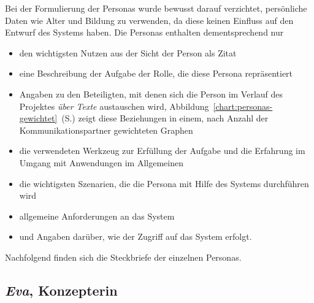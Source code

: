 Bei der Formulierung der Personas wurde bewusst darauf verzichtet, persönliche Daten wie Alter und Bildung zu verwenden, da diese keinen Einfluss auf den Entwurf des Systems haben. Die Personas enthalten dementsprechend nur 
\begin{itemize}\itemsep -5pt
\item den wichtigsten Nutzen aus der Sicht der Person als Zitat
\item eine Beschreibung der Aufgabe der Rolle, die diese Persona repräsentiert
\item Angaben zu den Beteiligten, mit denen sich die Person im Verlauf des Projektes \emph{über Texte} austauschen wird, Abbildung~\ref{chart:personas-gewichtet}~(S.\pageref{chart:personas-gewichtet}) zeigt diese Beziehungen in einem, nach Anzahl der Kommunikationspartner gewichteten Graphen
\item die verwendeten Werkzeug zur Erfüllung der Aufgabe und die Erfahrung im Umgang mit Anwendungen im Allgemeinen
\item die wichtigsten Szenarien, die die Persona mit Hilfe des Systems durchführen wird
\item allgemeine Anforderungen an das System
\item und Angaben darüber, wie der Zugriff auf das System erfolgt.
\end{itemize}

Nachfolgend finden sich die Steckbriefe der einzelnen Personas. 

\pagebreak

\subsection{\emph{Eva}, Konzepterin}\label{p:eva}

